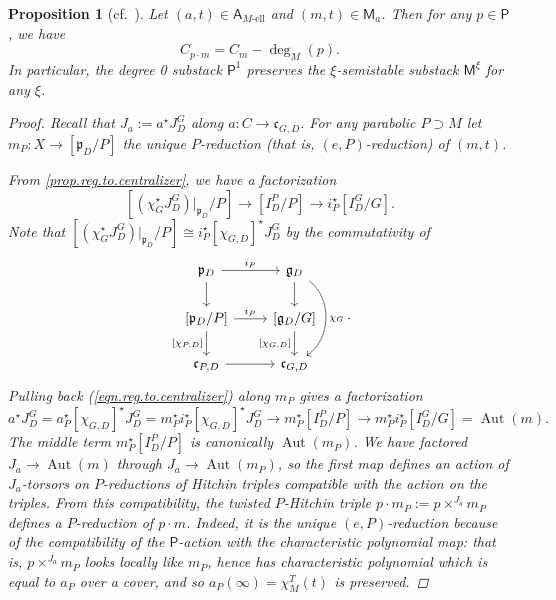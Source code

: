 \documentclass[openany]{amsbook}
\newtheorem{proposition}[theorem]{Proposition}
\theoremstyle{definition}
\theoremstyle{remark}
\numberwithin{equation}{section}
\renewcommand{\-}{\operatorname{-}}
\newcommand{\Aut}{\operatorname{Aut}}
\newcommand{\el}{\text{-ell}}
\newcommand{\bM}{\mathsf{M}}
\newcommand{\bA}{\mathsf{A}}
\newcommand{\bAe}[1]{\bA_{#1\el}}
\newcommand{\bP}{\mathsf{P}}
\newcommand{\fc}{\mathfrak{c}}
\newcommand{\fp}{\mathfrak{p}}
\renewcommand{\fg}{\mathfrak{g}}
\begin{document}
\begin{proposition}[{{cf.\ \cite[5.5.1]{CLII}}}] \label{prop.Pic.action.shift.convex}
Let $(a,t) \in \bAe{M}$ and $(m,t) \in \bM_a$. Then for any $p \in \bP$, we have
\begin{equation*}
    C_{p\cdot m} = C_m - \deg_M(p). 
\end{equation*}
In particular, the degree 0 substack $\bP^{1}$ preserves the $\xi$-semistable substack $\bM^\xi$ for any $\xi$.
    \begin{proof}
        Recall that $J_a := a^\star J_D^G$ along $a: C \to \fc_{G,D}$. For any parabolic $P \supset M$ let $m_P : X \to [\fp_D/P]$ the unique $P$-reduction (that is, $(e,P)$-reduction) of $(m,t)$. 

        From \ref{prop.reg.to.centralizer}, we have a factorization
        \begin{equation}
            {[(\chi_G^\star J_D^G)|_{\fp_D}/P]} \to {[I_D^P/P]} \to {i_P^\star [I_D^G/G]}. \label{eqn.reg.to.centralizer}
        \end{equation}
        Note that ${[(\chi_G^\star J_D^G)|_{\fp_D}/P]} \cong i_P^\star [\chi_{G,D}]^\star J_D^G$ by the commutativity of 
        $$
            \begin{tikzcd}[ampersand replacement=\&]
                \fp_D \ar[r, "i_P"] \ar[d] \& \fg_D \ar[d] \ar[dd, "\chi_G", bend left=55] \\
                {[\fp_D/P]} \ar[r, "i_P"] \ar[d, "{[\chi_{P,D}]}" left] \& {[\fg_D/G]} \ar[d, "{[\chi_{G,D}]}" left] \\
                \fc_{P,D} \ar[r] \& \fc_{G,D}
            \end{tikzcd}.
        $$
        Pulling back (\ref{eqn.reg.to.centralizer}) along $m_P$ gives a factorization 
        $$
            a^\star J_D^G = a_P^\star [\chi_{G,D}]^\star J_D^G = m_P^\star i_P^\star [\chi_{G,D}]^\star J_D^G \to m_P^\star [I_D^P/P] \to m_P^\star i_P^\star [I_D^G/G] = \Aut(m).
        $$
        The middle term $m_P^\star[I^P_D/P]$ is canonically $\Aut(m_P)$. We have factored $J_a \to \Aut(m)$ through $J_a \to \Aut(m_P)$, so the first map defines an action of $J_a$-torsors on $P$-reductions of Hitchin triples compatible with the action on the triples. From this compatibility, the twisted $P$-Hitchin triple $p\cdot m_P := p \times^{J_a} m_P$ defines a $P$-reduction of $p \cdot m$. Indeed, it is the unique $(e,P)$-reduction because of the compatibility of the $\bP$-action with the characteristic polynomial map: that is, $p \times^{J_a} m_P$ looks locally like $m_P$, hence has characteristic polynomial which is equal to $a_P$ over a cover, and so $a_P(\infty) = \chi_M^T(t)$ is preserved. 
        

\end{proof}
\end{proposition}
\end{document}
